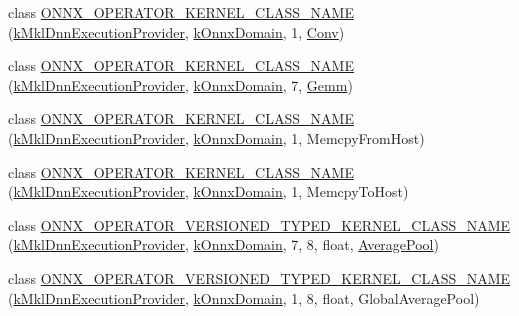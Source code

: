 \begin{DoxyCompactItemize}
\item 
class \mbox{\hyperlink{namespaceonnxruntime_1_1mkl__dnn_abe3d3c916d3881d4bfcf770c77efd9f0}{O\+N\+N\+X\+\_\+\+O\+P\+E\+R\+A\+T\+O\+R\+\_\+\+K\+E\+R\+N\+E\+L\+\_\+\+C\+L\+A\+S\+S\+\_\+\+N\+A\+ME}} (\mbox{\hyperlink{namespaceonnxruntime_abd1901c951bcb5845eeeaff9dd75ce97}{k\+Mkl\+Dnn\+Execution\+Provider}}, \mbox{\hyperlink{namespaceonnxruntime_ac0e7c0c106a2c9e9594560a3ab289fa0}{k\+Onnx\+Domain}}, 1, \mbox{\hyperlink{classonnxruntime_1_1mkl__dnn_1_1Conv}{Conv}})
\item 
class \mbox{\hyperlink{namespaceonnxruntime_1_1mkl__dnn_aee27f1486f7835cec56c3dc6358ae314}{O\+N\+N\+X\+\_\+\+O\+P\+E\+R\+A\+T\+O\+R\+\_\+\+K\+E\+R\+N\+E\+L\+\_\+\+C\+L\+A\+S\+S\+\_\+\+N\+A\+ME}} (\mbox{\hyperlink{namespaceonnxruntime_abd1901c951bcb5845eeeaff9dd75ce97}{k\+Mkl\+Dnn\+Execution\+Provider}}, \mbox{\hyperlink{namespaceonnxruntime_ac0e7c0c106a2c9e9594560a3ab289fa0}{k\+Onnx\+Domain}}, 7, \mbox{\hyperlink{classonnxruntime_1_1mkl__dnn_1_1Gemm}{Gemm}})
\item 
class \mbox{\hyperlink{namespaceonnxruntime_1_1mkl__dnn_a905cd21da3699b98ae4dca4ac6381462}{O\+N\+N\+X\+\_\+\+O\+P\+E\+R\+A\+T\+O\+R\+\_\+\+K\+E\+R\+N\+E\+L\+\_\+\+C\+L\+A\+S\+S\+\_\+\+N\+A\+ME}} (\mbox{\hyperlink{namespaceonnxruntime_abd1901c951bcb5845eeeaff9dd75ce97}{k\+Mkl\+Dnn\+Execution\+Provider}}, \mbox{\hyperlink{namespaceonnxruntime_ac0e7c0c106a2c9e9594560a3ab289fa0}{k\+Onnx\+Domain}}, 1, Memcpy\+From\+Host)
\item 
class \mbox{\hyperlink{namespaceonnxruntime_1_1mkl__dnn_a5206b86b78807d0179ddf69ba860dd45}{O\+N\+N\+X\+\_\+\+O\+P\+E\+R\+A\+T\+O\+R\+\_\+\+K\+E\+R\+N\+E\+L\+\_\+\+C\+L\+A\+S\+S\+\_\+\+N\+A\+ME}} (\mbox{\hyperlink{namespaceonnxruntime_abd1901c951bcb5845eeeaff9dd75ce97}{k\+Mkl\+Dnn\+Execution\+Provider}}, \mbox{\hyperlink{namespaceonnxruntime_ac0e7c0c106a2c9e9594560a3ab289fa0}{k\+Onnx\+Domain}}, 1, Memcpy\+To\+Host)
\item 
class \mbox{\hyperlink{namespaceonnxruntime_1_1mkl__dnn_adfc1bcfe7658a15444b6e88aeb277aa7}{O\+N\+N\+X\+\_\+\+O\+P\+E\+R\+A\+T\+O\+R\+\_\+\+V\+E\+R\+S\+I\+O\+N\+E\+D\+\_\+\+T\+Y\+P\+E\+D\+\_\+\+K\+E\+R\+N\+E\+L\+\_\+\+C\+L\+A\+S\+S\+\_\+\+N\+A\+ME}} (\mbox{\hyperlink{namespaceonnxruntime_abd1901c951bcb5845eeeaff9dd75ce97}{k\+Mkl\+Dnn\+Execution\+Provider}}, \mbox{\hyperlink{namespaceonnxruntime_ac0e7c0c106a2c9e9594560a3ab289fa0}{k\+Onnx\+Domain}}, 7, 8, float, \mbox{\hyperlink{classonnxruntime_1_1AveragePool}{Average\+Pool}})
\item 
class \mbox{\hyperlink{namespaceonnxruntime_1_1mkl__dnn_a4a4119c3e027a12c2ca656169aa9467f}{O\+N\+N\+X\+\_\+\+O\+P\+E\+R\+A\+T\+O\+R\+\_\+\+V\+E\+R\+S\+I\+O\+N\+E\+D\+\_\+\+T\+Y\+P\+E\+D\+\_\+\+K\+E\+R\+N\+E\+L\+\_\+\+C\+L\+A\+S\+S\+\_\+\+N\+A\+ME}} (\mbox{\hyperlink{namespaceonnxruntime_abd1901c951bcb5845eeeaff9dd75ce97}{k\+Mkl\+Dnn\+Execution\+Provider}}, \mbox{\hyperlink{namespaceonnxruntime_ac0e7c0c106a2c9e9594560a3ab289fa0}{k\+Onnx\+Domain}}, 1, 8, float, Global\+Average\+Pool)

\end{DoxyCompactItemize}
